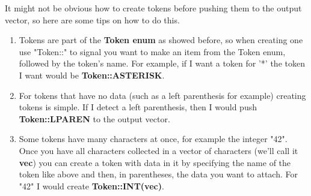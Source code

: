 \documentclass[
	12pt, %
]{fphw}
\begin{document}
\begin{problem}
    It might not be obvious how to create tokens before pushing them to the output vector, so here are some tips on how to do this.
    \\
    \begin{enumerate}
        \item Tokens are part of the \textbf{Token enum} as showed before, so when creating one use "Token::" to signal you want to make an item from the Token enum, followed by the token's name. For example, if I want a token for '*' the token I want would be \textbf{Token::ASTERISK}.
        \item For tokens that have no data (such as a left parenthesis for example) creating tokens is simple. If I detect a left parenthesis, then I would push \textbf{Token::LPAREN} to the output vector.
        \item Some tokens have many characters at once, for example the integer "42". Once you have all characters collected in a vector of characters (we'll call it \textbf{vec}) you can create a token with data in it by specifying the name of the token like above and then, in parentheses, the data you want to attach. For "42" I would create \textbf{Token::INT(vec)}.
    \end{enumerate}
\end{problem}

\pagebreak
\end{document}
